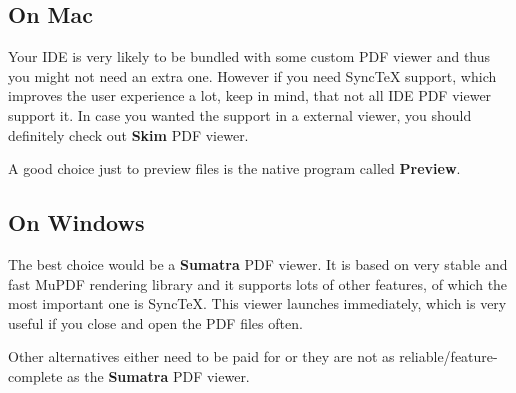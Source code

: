 \documentclass[
    draft
]{scrartcl}
\begin{document}
%
\subsection{On Mac}

Your IDE is very likely to be bundled with some custom PDF viewer and thus you
    might not need an extra one.
%
However if you need Sync\TeX{} support, which improves the user experience a
    lot, keep in mind, that not all IDE PDF viewer support it.
%
In case you wanted the support in a external viewer, you should definitely check
    out \textbf{Skim} PDF viewer.

%
A good choice just to preview files is the native program called
    \textbf{Preview}.

%
\subsection{On Windows}

The best choice would be a \textbf{Sumatra} PDF viewer.
%
It is based on very stable and fast MuPDF rendering library and it supports lots
    of other features, of which the most important one is Sync\TeX{}.
%
This viewer launches immediately, which is very useful if you close and open the
    PDF files often.

%
Other alternatives either need to be paid for or they are not as
    reliable/feature-complete as the \textbf{Sumatra} PDF viewer.
\end{document}
